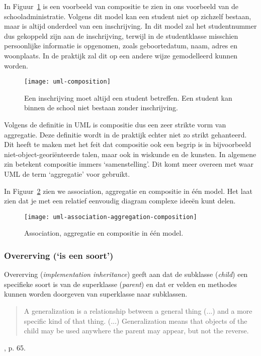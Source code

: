 In Figuur~\ref{fig:uml-composition} is een voorbeeld van compositie te zien 
in ons voorbeeld van de schooladministratie. Volgens dit model kan een student 
niet op zichzelf bestaan, maar is altijd onderdeel van een inschrijving. 
In dit model zal het studentnummer dus gekoppeld zijn aan de inschrijving, terwijl 
in de studentklasse misschien persoonlijke informatie is opgenomen, 
zoals geboortedatum, naam, adres en woonplaats. In de praktijk zal dit op een andere
wijze gemodelleerd kunnen worden.

\begin{figure}[H]
    \centering
    \texttt{[image: uml-composition]}
    \caption{Een inschrijving moet altijd een student betreffen. 
    Een student kan binnen de school niet bestaan zonder inschrijving.}
    \label{fig:uml-composition}
\end{figure}

Volgens de definitie in UML is compositie dus een zeer strikte vorm 
van aggregatie. Deze definitie wordt in de praktijk echter niet zo 
strikt gehanteerd. Dit heeft te maken met het feit dat compositie 
ook een begrip is in bijvoorbeeld niet-object-georiënteerde 
talen, maar ook in wiskunde en de kunsten. In algemene zin betekent
compositie immers `samenstelling'. Dit komt meer overeen met waar 
UML de term `aggregatie' voor gebruikt.

In Figuur~\ref{fig:uml-association-aggregation-composition} zien we 
association, aggregatie en compositie in één model. Het laat zien dat je 
met een relatief eenvoudig diagram complexe ideeën kunt delen.

\begin{figure}[H]
    \centering
    \texttt{[image: uml-association-aggregation-composition]}
    \caption{Association, aggregatie en compositie in één model.}
    \label{fig:uml-association-aggregation-composition}
\end{figure}

\subsubsection{Overerving (`is een soort')}
Overerving (\textit{implementation inheritance}) 
geeft aan dat de subklasse (\textit{child}) een 
specifieke soort is van de superklasse (\textit{parent}) en dat er velden en methodes 
kunnen worden doorgeven van superklasse naar subklassen. 

\blockquote{
    A generalization is a relationship between a general thing (...)
    and a more specific kind of that thing.
    \newline\newline
    (...)
    \newline\newline
    Generalization means that objects of the child may be used
    anywhere the parent may appear, but not the reverse.
}{\cite{Booch1999}, p. 65.}

